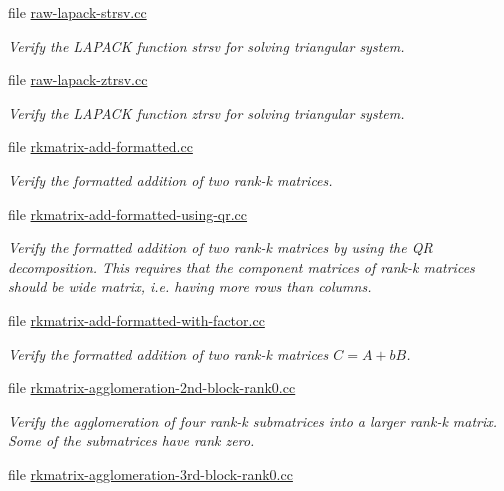 \begin{DoxyCompactItemize}
file \hyperlink{raw-lapack-strsv_8cc}{raw-\/lapack-\/strsv.\+cc}
\begin{DoxyCompactList}\small\item\em Verify the L\+A\+P\+A\+CK function {\ttfamily strsv} for solving triangular system. \end{DoxyCompactList}\item 
file \hyperlink{raw-lapack-ztrsv_8cc}{raw-\/lapack-\/ztrsv.\+cc}
\begin{DoxyCompactList}\small\item\em Verify the L\+A\+P\+A\+CK function {\ttfamily ztrsv} for solving triangular system. \end{DoxyCompactList}\item 
file \hyperlink{rkmatrix-add-formatted_8cc}{rkmatrix-\/add-\/formatted.\+cc}
\begin{DoxyCompactList}\small\item\em Verify the formatted addition of two rank-\/k matrices. \end{DoxyCompactList}\item 
file \hyperlink{rkmatrix-add-formatted-using-qr_8cc}{rkmatrix-\/add-\/formatted-\/using-\/qr.\+cc}
\begin{DoxyCompactList}\small\item\em Verify the formatted addition of two rank-\/k matrices by using the QR decomposition. This requires that the component matrices of rank-\/k matrices should be wide matrix, i.\+e. having more rows than columns. \end{DoxyCompactList}\item 
file \hyperlink{rkmatrix-add-formatted-with-factor_8cc}{rkmatrix-\/add-\/formatted-\/with-\/factor.\+cc}
\begin{DoxyCompactList}\small\item\em Verify the formatted addition of two rank-\/k matrices $C = A + b B$. \end{DoxyCompactList}\item 
file \hyperlink{rkmatrix-agglomeration-2nd-block-rank0_8cc}{rkmatrix-\/agglomeration-\/2nd-\/block-\/rank0.\+cc}
\begin{DoxyCompactList}\small\item\em Verify the agglomeration of four rank-\/k submatrices into a larger rank-\/k matrix. Some of the submatrices have rank zero. \end{DoxyCompactList}\item 
file \hyperlink{rkmatrix-agglomeration-3rd-block-rank0_8cc}{rkmatrix-\/agglomeration-\/3rd-\/block-\/rank0.\+cc}

\end{DoxyCompactItemize}
